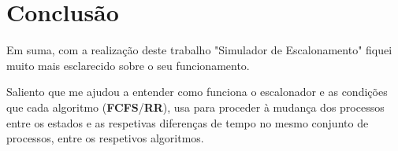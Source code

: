 \documentclass[11pt]{article}   %
\begin{document}
\newpage
\section{Conclusão} %
\hspace{0,5cm}Em suma, com a realização deste trabalho "Simulador de Escalonamento" fiquei muito mais esclarecido sobre o seu funcionamento. \par
Saliento que me ajudou a entender como funciona o escalonador e as condições que cada algoritmo (\textbf{FCFS}/\textbf{RR}), usa para proceder à mudança dos processos entre os estados e as respetivas diferenças de tempo no mesmo conjunto de processos, entre os respetivos algoritmos.  
\end{document}
